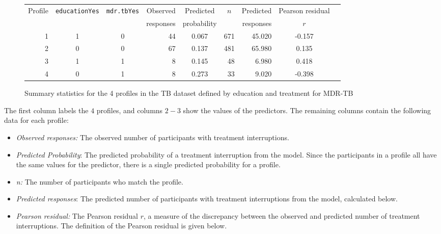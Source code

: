 \begin{figure}[ht]
\centering
\begin{tabular}{rrrrrrrrr}
  \hline
 Profile &  \texttt{educationYes} & \texttt{mdr.tbYes} & Observed & \multicolumn{1}{c}{Predicted}  &
 \multicolumn{1}{c}{$n$} & Predicted & Pearson residual \\
 & & &  responses & \multicolumn{1}{c}{probability} & & responses & \multicolumn{1}{c}{$r$} \\
  \hline
1 & \multicolumn{1}{c}{1} & \multicolumn{1}{c}{0} &
 44 & \multicolumn{1}{c}{0.067} & 671 & 45.020 & \multicolumn{1}{c}{-0.157} \\
  2  & \multicolumn{1}{c}{0} & \multicolumn{1}{c}{0}
  & 67 & \multicolumn{1}{c}{0.137} & 481 & 65.980 & \multicolumn{1}{c}{0.135} \\
  3  & \multicolumn{1}{c}{1} & \multicolumn{1}{c}{1}
  & 8 & \multicolumn{1}{c}{0.145} & 48 & 6.980 & \multicolumn{1}{c}{0.418} \\
  4  & \multicolumn{1}{c}{0} & \multicolumn{1}{c}{1}
  & 8 & \multicolumn{1}{c}{0.273} & 33 & 9.020 & \multicolumn{1}{c}{-0.398} \\
   \hline
\end{tabular}
\caption{Summary statistics for the 4 profiles in the TB dataset
       defined by education and treatment for MDR-TB}
\label{figure:tbInterruptProfiles}
\end{figure}

The first column labels the $4$ profiles, and columns $2-3$ show the values of the predictors.  The remaining columns contain the following data for each profile:
\begin{itemize}

\item \textit{Observed responses:} The observed number of participants with treatment interruptions.

\item \textit{Predicted Probability}:  The predicted probability of a treatment interruption from the model.  Since the participants in a profile all have the same values for the predictor, there is a single predicted probability for a profile.

\item \textit{n:} The number of participants who match the profile.

\item \textit{Predicted responses}: The predicted number of participants with treatment interruptions from the model, calculated below.

\item \textit{Pearson residual:}  The Pearson residual $r$, a measure of the discrepancy between the observed and predicted number of treatment interruptions.  The definition of the Pearson residual is given below.

\end{itemize}

